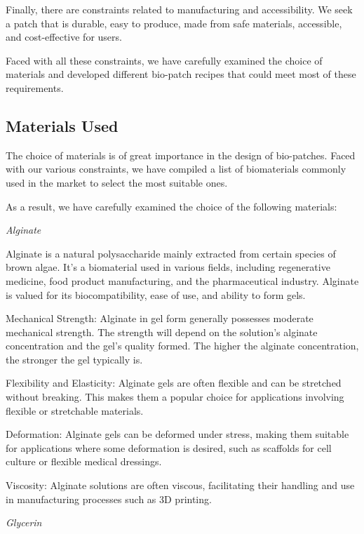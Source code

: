 Finally, there are constraints related to manufacturing and accessibility. We seek a patch that is durable, easy to produce, made from safe materials, accessible, and cost-effective for users.

Faced with all these constraints, we have carefully examined the choice of materials and developed different bio-patch recipes that could meet most of these requirements.

\subsection{Materials Used}
The choice of materials is of great importance in the design of bio-patches. Faced with our various constraints, we have compiled a list of biomaterials commonly used in the market to select the most suitable ones.

As a result, we have carefully examined the choice of the following materials:

\textit{Alginate}

Alginate is a natural polysaccharide mainly extracted from certain species of brown algae. It’s a biomaterial used in various fields, including regenerative medicine, food product manufacturing, and the pharmaceutical industry. Alginate is valued for its biocompatibility, ease of use, and ability to form gels.
\item Mechanical Strength: Alginate in gel form generally possesses moderate mechanical strength. The strength will depend on the solution's alginate concentration and the gel's quality formed. The higher the alginate concentration, the stronger the gel typically is.
\item Flexibility and Elasticity: Alginate gels are often flexible and can be stretched without breaking. This makes them a popular choice for applications involving flexible or stretchable materials.
\item Deformation: Alginate gels can be deformed under stress, making them suitable for applications where some deformation is desired, such as scaffolds for cell culture or flexible medical dressings.
\item Viscosity: Alginate solutions are often viscous, facilitating their handling and use in manufacturing processes such as 3D printing.

\textit{Glycerin}

